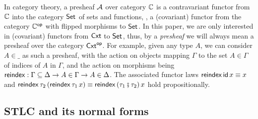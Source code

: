 \documentclass[sigplan,screen,fleqn]{acmart}
\begin{document}
In category theory, a presheaf $\mathcal{A}$ over category $\mathbb{C}$ is a contravariant
functor from $\mathbb{C}$ into the category $\mathsf{Set}_{}$ of sets and functions, \ie, a
(covariant) functor from the category $\mathbb{C}^{\mathsf{op}}$ with flipped morphisms
to $\mathsf{Set}_{}$.
In this paper, we are only interested in (covariant) functors from $\mathsf{Cxt}$ to
$\mathsf{Set}_{}$, thus,
by a \emph{presheaf} we will always mean a presheaf over the category $\mathsf{Cxt}^{\mathsf{op}}$.
For example, given any type $A$, we can
consider $A{\in}\_$ as such a presheaf, with the action on objects mapping $\Gamma$
to the set $A \in \Gamma$ of indices of $A$ in $\Gamma$, and the action on morphisms
being
$\mathsf{reindex} : \Gamma \subseteq \Delta \to A \in \Gamma \to A \in
\Delta$.  The associated functor laws $\mathsf{reindex}\,\mathsf{id}\,x \equiv x$ and
$\mathsf{reindex}\,\tau_2\,(\mathsf{reindex}\,\tau_1\,x) \equiv \mathsf{reindex}\,(\tau_1 \fatsemi
\tau_2)\,x$ hold propositionally.

\subsection{STLC and its normal forms}
\end{document}
